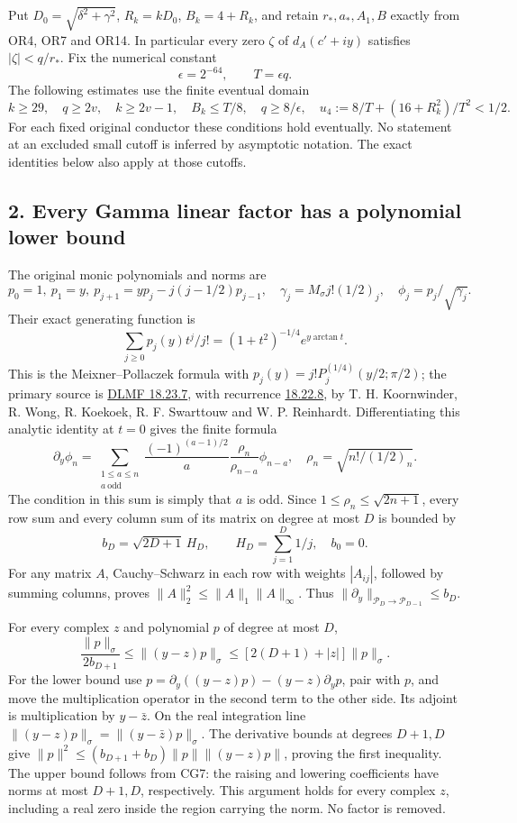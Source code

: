 \documentclass[11pt]{article}
\begin{document}
Put \(D_0=\sqrt{\delta^2+\gamma^2}\), \(R_k=kD_0\), \(B_k=4+R_k\), and retain \(r_*,a_*,A_1,B\) exactly from OR4, OR7 and OR14. In particular every zero \(\zeta\) of \(d_A(c'+iy)\) satisfies \(|\zeta|<q/r_*\). Fix the numerical constant \[
\epsilon=2^{-64},\qquad T=\epsilon q.
\tag{CG5}
\] The following estimates use the finite eventual domain \[
k\ge29,\quad q\ge2v,\quad k\ge2v-1,\quad
B_k\le T/8,\quad q\ge8/\epsilon,
\quad u_4:=8/T+(16+R_k^2)/T^2<1/2.
\tag{CG6}
\] For each fixed original conductor these conditions hold eventually. No statement at an excluded small cutoff is inferred by asymptotic notation. The exact identities below also apply at those cutoffs.

\subsection{2. Every Gamma linear factor has a polynomial lower bound}\label{every-gamma-linear-factor-has-a-polynomial-lower-bound}

The original monic polynomials and norms are \[
p_0=1,\ p_1=y,\ p_{j+1}=yp_j-j(j-1/2)p_{j-1},
\quad \gamma_j=M_\sigma j!(1/2)_j,
\quad \phi_j=p_j/\sqrt{\gamma_j}.
\tag{CG7}
\] Their exact generating function is \[
\sum_{j\ge0}p_j(y)t^j/j!=(1+t^2)^{-1/4}e^{y\arctan t}.
\tag{CG8}
\] This is the Meixner--Pollaczek formula with \(p_j(y)=j!P_j^{(1/4)}(y/2;\pi/2)\); the primary source is \href{https://dlmf.nist.gov/18.23.E7}{DLMF 18.23.7}, with recurrence \href{https://dlmf.nist.gov/18.22.E8}{18.22.8}, by T. H. Koornwinder, R. Wong, R. Koekoek, R. F. Swarttouw and W. P. Reinhardt. Differentiating this analytic identity at \(t=0\) gives the finite formula \[
\partial_y\phi_n
=\sum_{\substack{1\le a\le n\\a\ \mathrm{odd}}}
\frac{(-1)^{(a-1)/2}}a\frac{\rho_n}{\rho_{n-a}}\phi_{n-a},
\quad\rho_n=\sqrt{n!/(1/2)_n}.
\tag{CG9}
\] The condition in this sum is simply that \(a\) is odd. Since \(1\le\rho_n\le\sqrt{2n+1}\), every row sum and every column sum of its matrix on degree at most \(D\) is bounded by \[
b_D=\sqrt{2D+1}\,H_D,\qquad H_D=\sum_{j=1}^D1/j,
\quad b_0=0.
\tag{CG10}
\] For any matrix \(A\), Cauchy--Schwarz in each row with weights \(|A_{ij}|\), followed by summing columns, proves \(\|A\|_2^2\le\|A\|_1\|A\|_\infty\). Thus \(\|\partial_y\|_{\mathcal P_D\to\mathcal P_{D-1}}\le b_D\).

For every complex \(z\) and polynomial \(p\) of degree at most \(D\), \[
\boxed{\frac{\|p\|_\sigma}{2b_{D+1}}
\le\|(y-z)p\|_\sigma
\le[2(D+1)+|z|]\|p\|_\sigma.}
\tag{CG11}
\] For the lower bound use \(p=\partial_y((y-z)p)-(y-z)\partial_yp\), pair with \(p\), and move the multiplication operator in the second term to the other side. Its adjoint is multiplication by \(y-\bar z\). On the real integration line \(\|(y-z)p\|_\sigma=\|(y-\bar z)p\|_\sigma\). The derivative bounds at degrees \(D+1,D\) give \(\|p\|^2\le(b_{D+1}+b_D)\|p\|\|(y-z)p\|\), proving the first inequality. The upper bound follows from CG7: the raising and lowering coefficients have norms at most \(D+1,D\), respectively. This argument holds for every complex \(z\), including a real zero inside the region carrying the norm. No factor is removed.
\end{document}
